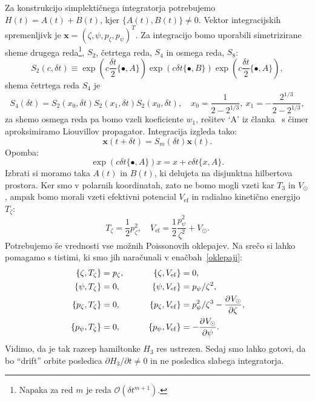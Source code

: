 \documentclass[12pt, a4paper]{article}
\newcommand{\sfrac}[2]{
    \ensuremath{\textstyle{\frac{#1}{#2}}}
}
\newcommand{\der}[3][]{
    \ensuremath{ \frac{\partial^{#1} #2}{\partial #3^{#1}} }
}
\newcommand{\Vef}{
    \ensuremath{V_\mathrm{ef}}
}
\begin{document}
Za konstrukcijo simplekti\v cnega integratorja potrebujemo $H(t) = A(t) + B(t)$, kjer $\{A(t), B(t)\} \neq 0$.
Vektor integracijskih spremenljivk je $\mathbf{x} = (\zeta, \psi, p_\zeta, p_\psi)^T$. Za integracijo bomo
uporabili simetrizirane sheme drugega reda\footnote{Napaka za red $m$ je reda $\mathcal{O}(\delta t^{m+1})$.},
$S_2$, \v cetrtega reda, $S_4$ in osmega reda, $S_8$:
\[
    S_2(c,\delta t) \equiv \exp(c\sfrac{\delta t}{2}\{\bullet, A\})\exp(c\delta t\{\bullet, B\})
    \exp(c\sfrac{\delta t}{2}\{\bullet, A\}),
\]
shema \v cetrtega reda $S_4$ je
\begin{equation}
    S_4(\delta t) = S_2(x_0, \delta t) S_2 (x_1, \delta t) S_2 (x_0, \delta t), \quad
        x_0 = \frac{1}{2 - 2^{1/3}},\ x_1 = -\frac{2^{1/3}}{2 - 2^{1/3}},
\end{equation}
za shemo osmega reda pa bomo vzeli koeficiente $w_1$, re\v sitev `$\mathrm{A}$' iz \v clanka~\cite{yoshida}
s \v cimer aproksimiramo Liouvillov propagator. Integracija izgleda tako:
\[
    \mathbf{x}(t + \delta t) = S_m(\delta t) \mathbf{x}(t).
\]
Opomba:
\[
    \exp(c\delta t\{\bullet, A\})x = x + c\delta t\{x, A\}.
\]
Izbrati si moramo taka $A(t)$ in $B(t)$, ki delujeta na disjunktna hilbertova prostora. Ker smo v polarnih koordinatah,
zato ne bomo mogli vzeti kar $T_3$ in $V_\odot$, ampak bomo morali vzeti efektivni potencial $\Vef$ in radialno
kineti\v cno energijo $T_\zeta$:
\begin{equation}
    T_\zeta = \frac{1}{2}p_\zeta^2, \quad \Vef = \frac{1}{2}\frac{p_\psi^2}{\zeta^2} + V_\odot.
\end{equation}
Potrebujemo \v se vrednosti vse mo\v znih Poissonovih oklepajev. Na sre\v co si lahko pomagamo s tistimi, ki
smo jih nara\v cunali v ena\v cbah~\eqref{oklepaji}:
\begin{alignat}{3}
    \{\zeta, T_\zeta\}        &= p_\zeta, \qquad &
    \{\zeta, \Vef\}           &= 0, \notag \\
    \{\psi, T_\zeta\}         &= 0, \qquad &
    \{\psi, \Vef\}            &= p_\psi/\zeta^2, \notag \\
    \{p_\zeta, T_\zeta\}      &= 0, \qquad&
    \{p_\zeta, \Vef\}         &= p^2_\psi/\zeta^3 - \der{V_\odot}{\zeta}, \notag \\
    \{p_\psi, T_\zeta\}       &= 0, \qquad &
    \{p_\psi, \Vef\}          &= -\der{V_\odot}{\psi}.
\end{alignat}
Vidimo, da je tak razcep hamiltonke $H_3$ res ustrezen. Sedaj smo lahko gotovi, da bo "`drift"' orbite posledica
$\partial H_3 / \partial t \neq 0$ in ne posledica slabega integratorja.
\end{document}
